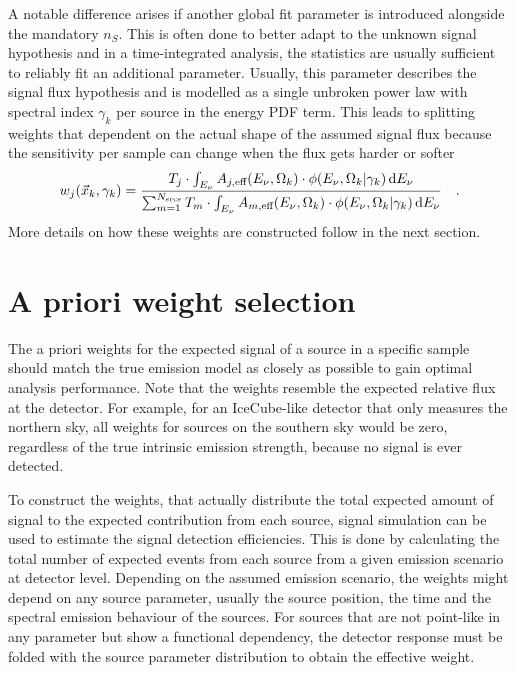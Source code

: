 A notable difference arises if another global fit parameter is introduced alongside the mandatory $n_S$.
This is often done to better adapt to the unknown signal hypothesis and in a time-integrated analysis, the statistics are usually sufficient to reliably fit an additional parameter.
Usually, this parameter describes the signal flux hypothesis and is modelled as a single unbroken power law with spectral index $\gamma_k$ per source in the energy PDF term.
This leads to splitting weights that dependent on the actual shape of the assumed signal flux because the sensitivity per sample can change when the flux gets harder or softer
\begin{equation}
  w_j(\vec{x}_k, \gamma_k)
  = \frac
      {
        T_j \cdot \int_{E_\nu} A_{j,\text{eff}}(E_\nu,\Omega_k)\cdot
        \phi(E_\nu, \Omega_k | \gamma_k)\,\mathrm{d}E_\nu
      }
      {
        \sum_{m=1}^{N_\text{srcs}}
        T_m \cdot \int_{E_\nu} A_{m,\text{eff}}(E_\nu,\Omega_k)\cdot
        \phi(E_\nu, \Omega_k | \gamma_k)\,\mathrm{d}E_\nu
      }
  \quad\text{.}
\end{equation}
More details on how these weights are constructed follow in the next section.


\section{A priori weight selection}
The a priori weights for the expected signal of a source in a specific sample should match the true emission model as closely as possible to gain optimal analysis performance.
Note that the weights resemble the expected relative flux at the detector.
For example, for an IceCube-like detector that only measures the northern sky, all weights for sources on the southern sky would be zero, regardless of the true intrinsic emission strength, because no signal is ever detected.

To construct the weights, that actually distribute the total expected amount of signal to the expected contribution from each source, signal simulation can be used to estimate the signal detection efficiencies.
This is done by calculating the total number of expected events from each source from a given emission scenario at detector level.
Depending on the assumed emission scenario, the weights might depend on any source parameter, usually the source position, the time and the spectral emission behaviour of the sources.
For sources that are not point-like in any parameter but show a functional dependency, the detector response must be folded with the source parameter distribution to obtain the effective weight.

